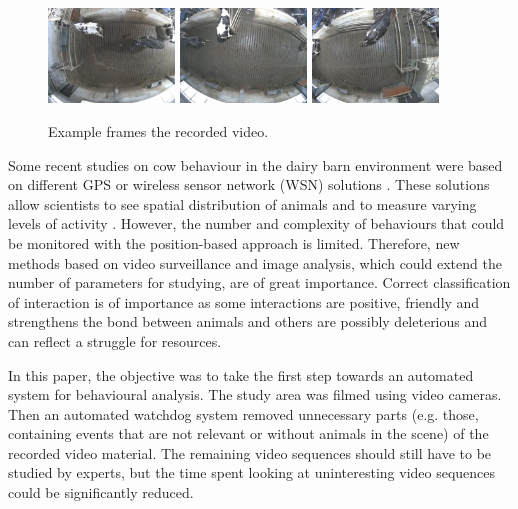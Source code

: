\documentclass{cta-author}
\begin{document}
\begin{figure}[b]
\begin{center}
  \includegraphics[width=0.3\textwidth]{old-2.jpg}
  \includegraphics[width=0.3\textwidth]{old-1.jpg}
  \includegraphics[width=0.3\textwidth]{old-0.jpg}
\end{center}
  \caption{Example frames the recorded video.}
  \label{fig:old}
\end{figure}


Some recent studies on cow behaviour in the dairy barn environment were based on different GPS or wireless 
sensor network (WSN) solutions \cite{Nadimietal2012}. These solutions allow scientists to see spatial 
distribution of animals and to measure varying levels of activity \cite{Nadimietal2012}. However, the number 
and complexity of behaviours that could be monitored with the position-based approach is limited. Therefore, 
new methods based on video surveillance and image analysis, which could extend the number of parameters for 
studying, are of great importance. Correct classification of interaction is of importance as some 
interactions are positive, friendly and strengthens the bond between animals and others are possibly 
deleterious and can reflect a struggle for resources.

In this paper, the objective was to take the first step towards an automated system for behavioural analysis. 
The study area was filmed using video cameras. Then an automated watchdog system removed unnecessary parts 
(e.g. those, containing events that are not relevant or without animals in the scene) of the recorded video 
material. The remaining video sequences should still have to be studied by experts, but the time spent 
looking at uninteresting video sequences could be significantly reduced. 
\end{document}
